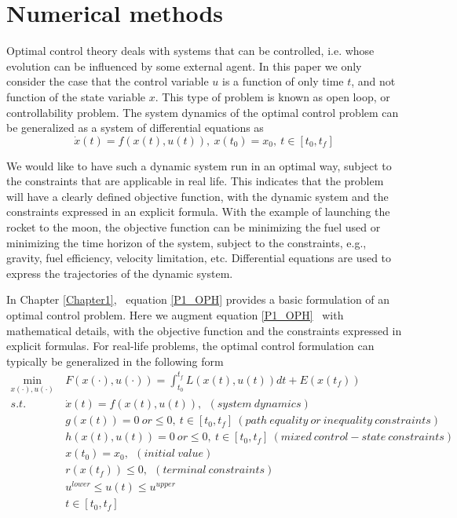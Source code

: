 \documentclass  [
  paper    = a4,
  BCOR     = 10mm,
  twoside,
  fontsize = 12pt,
  fleqn,
  toc      = bibnumbered,
  toc      = listofnumbered,
  numbers  = noendperiod,
  headings = normal,
  listof   = leveldown,
  version  = 3.03
]                                       {scrreprt}
\newcommand{\<}{\langle}
\renewcommand{\>}{\rangle}
\begin{document}
\chapter{Numerical methods}
\label{Chapter2}
Optimal control theory deals with systems that can be controlled, i.e. whose evolution can be influenced by some external agent. In this paper we only consider the case that the control variable $u$ is a function of only time $t$, and not function of the state variable $x$. This type of problem is known as open loop, or controllability problem. The system dynamics of the optimal control problem can be generalized as a system of differential equations as
\begin{equation}
	  \dot{x} (t) = f(x(t), u(t)), \ x(t_0) = x_0, \ t \in [t_0, t_f]
\end{equation}	  

We would like to have such a dynamic system run in an optimal way, subject to the constraints that are applicable in real life. This indicates that the problem will have a clearly defined objective function, with the dynamic system and the constraints expressed in an explicit formula. With the example of launching the rocket to the moon, the objective function can be minimizing the fuel used or minimizing the time horizon of the system, subject to the constraints, e.g., gravity, fuel efficiency, velocity limitation, etc. Differential equations are used to express the trajectories of the dynamic system. 

In Chapter \ref{Chapter1},  equation \ref{P1_OPH} provides a basic formulation of an optimal control problem. Here we augment equation \ref{P1_OPH}  with mathematical details, with the objective function and the constraints expressed in explicit formulas. For real-life problems, the optimal control formulation can typically be generalized in the following form  
	\begin{subequations}
		\begin{align}
			\underset{x(\cdot), u(\cdot)}{\text{min}}   \ &  F(x(\cdot), u(\cdot))  = \int_{t_0}^{t_f}L(x(t), u(t))dt + E (x(t_f)) \label{P2_cost} \\
			s.t.\ \ &  \dot{x} (t) = f(x(t), u(t)), \ \ (system \ dynamics)   \label{P2_sd} \\
			& g(x(t)) = 0 \  or \leq 0, \ t \in [t_0, t_f]\  (path\  equality\ or\ inequality\ constraints)  \label{P2_ec}\\
			& h(x(t), u(t)) =0\  or  \leq 0,\ t \in [t_0, t_f] \ (mixed \ control-state  \ constraints)  \label{P2_inc}\\
			& x(t_0) = x_0, \ \ (initial \ value) \\
			& r(x(t_f)) \leq 0, \ \ (terminal \ constraints)  \label{P2_final} \\
			& u^{lower} \leq u(t) \leq u^{upper}   \label{P2_box_u} \\ 
			& t \in [t_0, t_f]
		\end{align}
		\label{P2_OPM}
	\end{subequations}  
\end{document}
